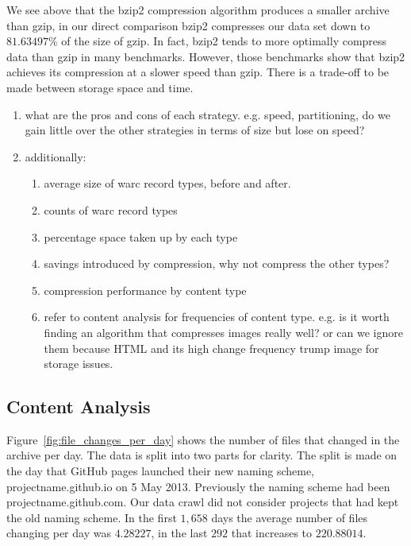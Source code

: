 \documentclass[11pt]{article}
\def \bzipvsgzippct {81.63497}
\def \iostarted {1,658}
\def \afterio {292}
\def \meanfilechangesfirst {4.28227}
\def \meanfilechangeslast {220.88014}
\begin{document}
    We see above that the bzip2 compression algorithm produces a smaller archive than gzip, in our direct comparison bzip2 compresses our data set down to $\bzipvsgzippct\%$ of the size of gzip. In fact, bzip2 tends to more optimally compress data than gzip in many benchmarks\footnotemark. However, those benchmarks show that bzip2 achieves its compression at a slower speed than gzip. There is a trade-off to be made between storage space and time.


    \begin{enumerate}
    \item what are the pros and cons of each strategy. e.g. speed, partitioning, do we gain little over the other strategies in terms of size but lose on speed?
    \item additionally:
    \begin{enumerate}
    \item average size of warc record types, before and after.
    \item counts of warc record types
    \item percentage space taken up by each type
    \item savings introduced by compression, why not compress the other types?
    \item compression performance by content type
    \item refer to content analysis for frequencies of content type. e.g. is it worth finding an algorithm that compresses images really well? or can we ignore them because HTML and its high change frequency trump image for storage issues.
    \end{enumerate}
    \end{enumerate}

  \subsection{Content Analysis}

    Figure~\ref{fig:file_changes_per_day} shows the number of files that changed in the archive per day. The data is split into two parts for clarity. The split is made on the day that GitHub pages launched their new naming scheme, projectname.github.io on 5 May 2013. Previously the naming scheme had been projectname.github.com. Our data crawl did not consider projects that had kept the old naming scheme. In the first $\iostarted$ days the average number of files changing per day was $\meanfilechangesfirst$, in the last $\afterio$ that increases to $\meanfilechangeslast$.
\end{document}
